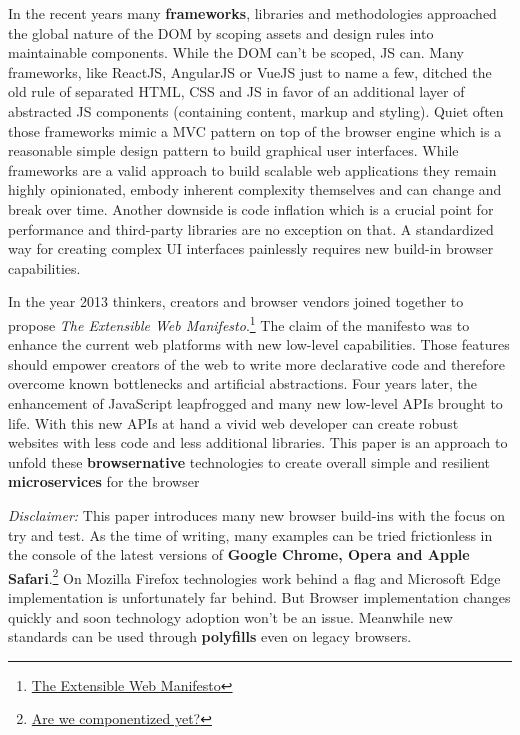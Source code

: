 \documentclass[]{article}
\begin{document}
In the recent years many \textbf{frameworks}, libraries and
methodologies approached the global nature of the DOM by scoping assets
and design rules into maintainable components. While the DOM can't be
scoped, JS can. Many frameworks, like ReactJS, AngularJS or VueJS just
to name a few, ditched the old rule of separated HTML, CSS and JS in
favor of an additional layer of abstracted JS components (containing
content, markup and styling). Quiet often those frameworks mimic a MVC
pattern on top of the browser engine which is a reasonable simple design
pattern to build graphical user interfaces. While frameworks are a valid
approach to build scalable web applications they remain highly
opinionated, embody inherent complexity themselves and can change and
break over time. Another downside is code inflation which is a crucial
point for performance and third-party libraries are no exception on
that. A standardized way for creating complex UI interfaces painlessly
requires new build-in browser capabilities.

In the year 2013 thinkers, creators and browser vendors joined together
to propose \emph{The Extensible Web Manifesto}.\footnote{\href{https://extensiblewebmanifesto.org/}{The
  Extensible Web Manifesto}} The claim of the manifesto was to enhance
the current web platforms with new low-level capabilities. Those
features should empower creators of the web to write more declarative
code and therefore overcome known bottlenecks and artificial
abstractions. Four years later, the enhancement of JavaScript
leapfrogged and many new low-level APIs brought to life. With this new
APIs at hand a vivid web developer can create robust websites with less
code and less additional libraries. This paper is an approach to unfold
these \textbf{browsernative} technologies to create overall simple and
resilient \textbf{microservices} for the browser

\emph{Disclaimer:} This paper introduces many new browser build-ins with
the focus on try and test. As the time of writing, many examples can be
tried frictionless in the console of the latest versions of
\textbf{Google Chrome, Opera and Apple Safari}.\footnote{\href{http://jonrimmer.github.io/are-we-componentized-yet/}{Are
  we componentized yet?}} On Mozilla Firefox technologies work behind a
flag and Microsoft Edge implementation is unfortunately far behind. But
Browser implementation changes quickly and soon technology adoption
won't be an issue. Meanwhile new standards can be used through
\textbf{polyfills} even on legacy browsers.
\end{document}

